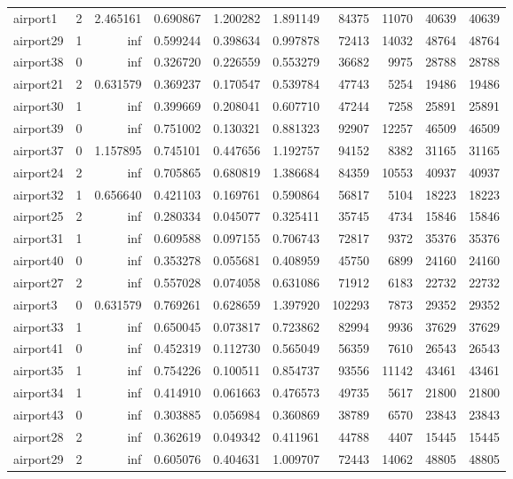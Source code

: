 \begin{longtable}{|l|r|r|r|r|r|r|r|r|r|}
airport1 & 2 & 2.465161 & 0.690867 & 1.200282 & 1.891149 & 84375 & 11070 & 40639 & 40639 \\
airport29 & 1 & inf & 0.599244 & 0.398634 & 0.997878 & 72413 & 14032 & 48764 & 48764 \\
airport38 & 0 & inf & 0.326720 & 0.226559 & 0.553279 & 36682 & 9975 & 28788 & 28788 \\
airport21 & 2 & 0.631579 & 0.369237 & 0.170547 & 0.539784 & 47743 & 5254 & 19486 & 19486 \\
airport30 & 1 & inf & 0.399669 & 0.208041 & 0.607710 & 47244 & 7258 & 25891 & 25891 \\
airport39 & 0 & inf & 0.751002 & 0.130321 & 0.881323 & 92907 & 12257 & 46509 & 46509 \\
airport37 & 0 & 1.157895 & 0.745101 & 0.447656 & 1.192757 & 94152 & 8382 & 31165 & 31165 \\
airport24 & 2 & inf & 0.705865 & 0.680819 & 1.386684 & 84359 & 10553 & 40937 & 40937 \\
airport32 & 1 & 0.656640 & 0.421103 & 0.169761 & 0.590864 & 56817 & 5104 & 18223 & 18223 \\
airport25 & 2 & inf & 0.280334 & 0.045077 & 0.325411 & 35745 & 4734 & 15846 & 15846 \\
airport31 & 1 & inf & 0.609588 & 0.097155 & 0.706743 & 72817 & 9372 & 35376 & 35376 \\
airport40 & 0 & inf & 0.353278 & 0.055681 & 0.408959 & 45750 & 6899 & 24160 & 24160 \\
airport27 & 2 & inf & 0.557028 & 0.074058 & 0.631086 & 71912 & 6183 & 22732 & 22732 \\
airport3 & 0 & 0.631579 & 0.769261 & 0.628659 & 1.397920 & 102293 & 7873 & 29352 & 29352 \\
airport33 & 1 & inf & 0.650045 & 0.073817 & 0.723862 & 82994 & 9936 & 37629 & 37629 \\
airport41 & 0 & inf & 0.452319 & 0.112730 & 0.565049 & 56359 & 7610 & 26543 & 26543 \\
airport35 & 1 & inf & 0.754226 & 0.100511 & 0.854737 & 93556 & 11142 & 43461 & 43461 \\
airport34 & 1 & inf & 0.414910 & 0.061663 & 0.476573 & 49735 & 5617 & 21800 & 21800 \\
airport43 & 0 & inf & 0.303885 & 0.056984 & 0.360869 & 38789 & 6570 & 23843 & 23843 \\
airport28 & 2 & inf & 0.362619 & 0.049342 & 0.411961 & 44788 & 4407 & 15445 & 15445 \\
airport29 & 2 & inf & 0.605076 & 0.404631 & 1.009707 & 72443 & 14062 & 48805 & 48805 \\

\end{longtable}
